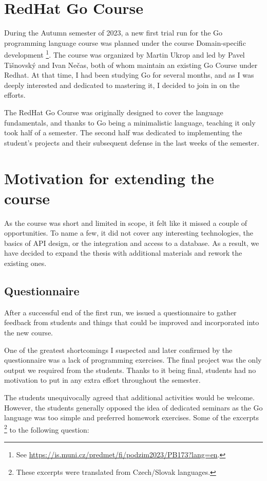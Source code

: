 \documentclass[
  digital,
  color,
  oneside,
  nosansbold,
  nocolorbold,
  lof,
  lot,
]{fithesis4}
\begin{document}
\section{RedHat Go Course}

During the Autumn semester of 2023, a new first trial run for the Go programming language course was planned under the course Domain-specific development
\footnote{See \url{https://is.muni.cz/predmet/fi/podzim2023/PB173?lang=en}.}.
The course was organized by Martin Ukrop and led by Pavel Tišnovský and Ivan Nečas, both of whom maintain an existing Go Course \cite{redhat-go-course} under Redhat. At that time, I had been studying Go for several months, and as I was deeply interested and dedicated to mastering it, I decided to join in on the efforts.

The RedHat Go Course was originally designed to cover the language fundamentals, and thanks to Go being a minimalistic language, teaching it only took half of a semester. The second half was dedicated to implementing the student's projects and their subsequent defense in the last weeks of the semester.

\section{Motivation for extending the course}

As the course was short and limited in scope, it felt like it missed a couple of opportunities. To name a few, it did not cover any interesting technologies, the basics of API design, or the integration and access to a database. As a result, we have decided to expand the thesis with additional materials and rework the existing ones.

\subsection{Questionnaire}

After a successful end of the first run, we issued a questionnaire to gather feedback from students and things that could be improved and incorporated into the new course.

One of the greatest shortcomings I suspected and later confirmed by the questionnaire was a lack of programming exercises. The final project was the only output we required from the students. Thanks to it being final, students had no motivation to put in any extra effort throughout the semester.

The students unequivocally agreed that additional activities would be welcome. However, the students generally opposed the idea of dedicated seminars as the Go language was too simple and preferred homework exercises. Some of the excerpts
\footnote{These excerpts were translated from Czech/Slovak languages.}
to the following question: \\
\end{document}
